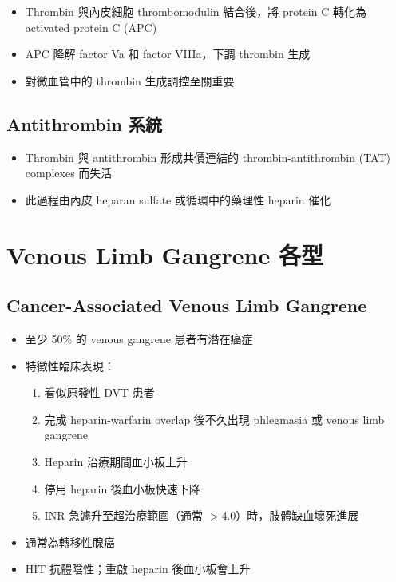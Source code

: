 \documentclass[12pt,a4paper]{article}
\begin{document}
\begin{itemize}
    \item Thrombin 與內皮細胞 thrombomodulin 結合後，將 protein C 轉化為 activated protein C (APC)
    \item APC 降解 factor Va 和 factor VIIIa，下調 thrombin 生成
    \item 對微血管中的 thrombin 生成調控至關重要
\end{itemize}

\subsection{Antithrombin 系統}

\begin{itemize}
    \item Thrombin 與 antithrombin 形成共價連結的 thrombin-antithrombin (TAT) complexes 而失活
    \item 此過程由內皮 heparan sulfate 或循環中的藥理性 heparin 催化
\end{itemize}


\section{Venous Limb Gangrene 各型}

\subsection{Cancer-Associated Venous Limb Gangrene}

\begin{itemize}
    \item 至少 50\% 的 venous gangrene 患者有潛在癌症
    \item 特徵性臨床表現：
    \begin{enumerate}
        \item 看似原發性 DVT 患者
        \item 完成 heparin-warfarin overlap 後不久出現 phlegmasia 或 venous limb gangrene
        \item Heparin 治療期間血小板上升
        \item 停用 heparin 後血小板快速下降
        \item INR 急遽升至超治療範圍（通常 $>$4.0）時，肢體缺血壞死進展
    \end{enumerate}
    \item 通常為轉移性腺癌
    \item HIT 抗體陰性；重啟 heparin 後血小板會上升
\end{itemize}
\end{document}
